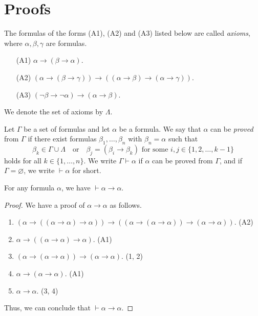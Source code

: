 \section{Proofs}
\begin{definition}
  The formulas of the forms (A1), (A2) and (A3) listed below are called
  \emph{axioms}, where $\alpha, \beta, \gamma$ are formulas.
  \begin{enumerate}[leftmargin=3.5em]
    \item[(A1)] $\alpha \to (\beta \to \alpha)$.
    \item[(A2)] $(\alpha \to (\beta \to \gamma)) \to
    ((\alpha \to \beta) \to (\alpha \to \gamma))$.
    \item[(A3)] $(\neg \beta \to \neg \alpha) \to (\alpha \to \beta)$.
  \end{enumerate}
  We denote the set of axioms by $\Lambda$.
\end{definition}

\begin{definition}
  Let $\Gamma$ be a set of formulas and let $\alpha$ be a formula.
  We say that $\alpha$ can be \emph{proved} from $\Gamma$ if there exist
  formulas $\beta_1, \dots, \beta_n$ with $\beta_n = \alpha$ such that
  \begin{equation*}
    \beta_k \in \Gamma \cup \Lambda
    \quad \text{or} \quad
    \text{$\beta_j = (\beta_i \to \beta_k)$ for some $i, j \in \{1, 2,
    \dots, k-1\}$}
  \end{equation*}
  holds for all $k \in \{1, \dots, n\}$.
  We write $\Gamma \vdash \alpha$ if $\alpha$ can be proved from $\Gamma$,
  and if $\Gamma = \varnothing$, we write $\vdash \alpha$ for short.
\end{definition}

\begin{theorem}
  \label{thm:identity}
  For any formula $\alpha$, we have $\vdash \alpha \to \alpha$.
\end{theorem}
\begin{proof}
  We have a proof of $\alpha \to \alpha$ as follows.
  \begin{enumerate}[(1)]
    \item $(\alpha \to ((\alpha \to \alpha) \to \alpha)) \to
    ((\alpha \to (\alpha \to \alpha)) \to (\alpha \to \alpha))$.
    \hfill (A2)
    \item $\alpha \to ((\alpha \to \alpha) \to \alpha)$. \hfill (A1)
    \item $(\alpha \to (\alpha \to \alpha)) \to (\alpha \to \alpha)$.
    \hfill (1, 2)
    \item $\alpha \to (\alpha \to \alpha)$. \hfill (A1)
    \item $\alpha \to \alpha$. \hfill (3, 4)
  \end{enumerate}
  Thus, we can conclude that $\vdash \alpha \to \alpha$.
\end{proof}

